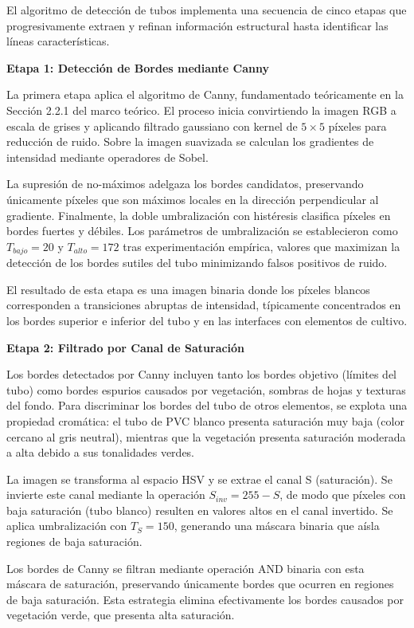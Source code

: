 El algoritmo de detección de tubos implementa una secuencia de cinco etapas que progresivamente extraen y refinan información estructural hasta identificar las líneas características.

\textbf{Etapa 1: Detección de Bordes mediante Canny}

La primera etapa aplica el algoritmo de Canny, fundamentado teóricamente en la Sección 2.2.1 del marco teórico. El proceso inicia convirtiendo la imagen RGB a escala de grises y aplicando filtrado gaussiano con kernel de $5 \times 5$ píxeles para reducción de ruido. Sobre la imagen suavizada se calculan los gradientes de intensidad mediante operadores de Sobel.

La supresión de no-máximos adelgaza los bordes candidatos, preservando únicamente píxeles que son máximos locales en la dirección perpendicular al gradiente. Finalmente, la doble umbralización con histéresis clasifica píxeles en bordes fuertes y débiles. Los parámetros de umbralización se establecieron como $T_{bajo} = 20$ y $T_{alto} = 172$ tras experimentación empírica, valores que maximizan la detección de los bordes sutiles del tubo minimizando falsos positivos de ruido.

El resultado de esta etapa es una imagen binaria donde los píxeles blancos corresponden a transiciones abruptas de intensidad, típicamente concentrados en los bordes superior e inferior del tubo y en las interfaces con elementos de cultivo.

\textbf{Etapa 2: Filtrado por Canal de Saturación}

Los bordes detectados por Canny incluyen tanto los bordes objetivo (límites del tubo) como bordes espurios causados por vegetación, sombras de hojas y texturas del fondo. Para discriminar los bordes del tubo de otros elementos, se explota una propiedad cromática: el tubo de PVC blanco presenta saturación muy baja (color cercano al gris neutral), mientras que la vegetación presenta saturación moderada a alta debido a sus tonalidades verdes.

La imagen se transforma al espacio HSV y se extrae el canal S (saturación). Se invierte este canal mediante la operación $S_{inv} = 255 - S$, de modo que píxeles con baja saturación (tubo blanco) resulten en valores altos en el canal invertido. Se aplica umbralización con $T_S = 150$, generando una máscara binaria que aísla regiones de baja saturación.

Los bordes de Canny se filtran mediante operación AND binaria con esta máscara de saturación, preservando únicamente bordes que ocurren en regiones de baja saturación. Esta estrategia elimina efectivamente los bordes causados por vegetación verde, que presenta alta saturación.

